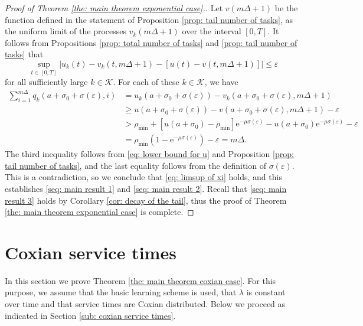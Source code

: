 \documentclass[a4paper, 12pt]{article}
\theoremstyle{definition}
\newcommand{\calK}{\mathcal{K}}
\newcommand{\e}{\mathrm{e}}
\begin{document}
\begin{proof}[Proof of Theorem \ref{the: main theorem exponential case}.]
Let $v(m \Delta + 1)$ be the function defined in the statement of Proposition \ref{prop: tail number of tasks}, as the uniform limit of the processes $v_k(m \Delta + 1)$ over the interval $[0, T]$. It follows from Propositions \ref{prop: total number of tasks} and \ref{prop: tail number of tasks} that
\begin{equation*}
	\sup_{t \in [0, T]} \left|u_k(t) - v_k(t, m\Delta + 1) - \left[u(t) - v(t, m \Delta + 1)\right]\right| \leq \varepsilon
\end{equation*}
for all sufficiently large $k \in \calK$. For each of these $k \in \calK$, we have
\begin{align*}
	\sum_{i = 1}^{m \Delta} q_k\left(a + \sigma_0 + \sigma(\varepsilon), i\right) &= u_k\left(a + \sigma_0 + \sigma(\varepsilon)\right) - v_k(a + \sigma_0 + \sigma(\varepsilon), m \Delta + 1) \\
	&\geq u\left(a + \sigma_0 + \sigma(\varepsilon)\right) - v(a + \sigma_0 + \sigma(\varepsilon), m \Delta + 1) - \varepsilon \\
	&> \rho_{\min} + \left[u(a + \sigma_0) - \rho_{\min}\right]\e^{-\mu\sigma(\varepsilon)} - u(a + \sigma_0)\e^{-\mu\sigma(\varepsilon)} - \varepsilon \\
	&= \rho_{\min} \left(1 - \e^{-\mu\sigma(\varepsilon)}\right) - \varepsilon = m \Delta.
\end{align*}
The third inequality follows from \eqref{eq: lower bound for u} and Proposition \ref{prop: tail number of tasks}, and the last equality follows from the definition of $\sigma(\varepsilon)$. This is a contradiction, so we conclude that \eqref{eq: limsup of xi} holds, and this establishes \eqref{seq: main result 1} and \eqref{seq: main result 2}. Recall that \eqref{seq: main result 3} holds by Corollary \ref{cor: decay of the tail}, thus the proof of Theorem \ref{the: main theorem exponential case} is complete.
%
\end{proof}

\section{Coxian service times}
\label{sec: coxian service times}

In this section we prove Theorem \ref{the: main theorem coxian case}. For this purpose, we assume that the basic learning scheme is used, that $\lambda$ is constant over time and that service times are Coxian distributed. Below we proceed as indicated in Section \ref{sub: coxian service times}.
\end{document}
